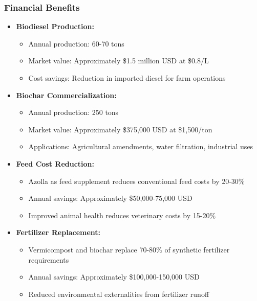 \subsubsection{Financial Benefits}
\begin{itemize}
    \item \textbf{Biodiesel Production:} 
    \begin{itemize}
        \item Annual production: 60-70 tons
        \item Market value: Approximately \$1.5 million USD at \$0.8/L
        \item Cost savings: Reduction in imported diesel for farm operations
    \end{itemize}
    
    \item \textbf{Biochar Commercialization:}
    \begin{itemize}
        \item Annual production: 250 tons
        \item Market value: Approximately \$375,000 USD at \$1,500/ton
        \item Applications: Agricultural amendments, water filtration, industrial uses
    \end{itemize}
    
    \item \textbf{Feed Cost Reduction:}
    \begin{itemize}
        \item Azolla as feed supplement reduces conventional feed costs by 20-30\%
        \item Annual savings: Approximately \$50,000-75,000 USD
        \item Improved animal health reduces veterinary costs by 15-20\%
    \end{itemize}
    
    \item \textbf{Fertilizer Replacement:}
    \begin{itemize}
        \item Vermicompost and biochar replace 70-80\% of synthetic fertilizer requirements
        \item Annual savings: Approximately \$100,000-150,000 USD
        \item Reduced environmental externalities from fertilizer runoff
    \end{itemize}
\end{itemize}

